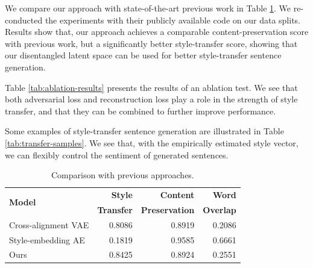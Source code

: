 We compare our approach with state-of-the-art previous work in Table \ref{tab:comparison-previous}. We re-conducted the experiments with their publicly available code on our data splits.
Results show that, our approach achieves a comparable content-preservation score with previous work, but a significantly better style-transfer score, showing that our disentangled latent space can be used for better style-transfer sentence generation.

Table \ref{tab:ablation-results} presents the results of an ablation test. We see that both adversarial loss and reconstruction loss play a role in the strength of style transfer, and that they can be combined to further improve performance.

Some examples of style-transfer sentence generation are illustrated in Table \ref{tab:transfer-samples}. We see that, with the empirically estimated style vector, we can flexibly control the sentiment of generated sentences.

\begin{table}[ht]
	\centering
	\begin{tabular}{| l | r | r | r |}
		\hline
		\multirow{2}{*}{\textbf{Model}}           & \textbf{Style}    & \textbf{Content}      & \textbf{Word}    \\
		                                          & \textbf{Transfer} & \textbf{Preservation} & \textbf{Overlap} \\
		\hline
		\hline
		Cross-alignment VAE \citep{shen2017style} & 0.8086            & 0.8919                & 0.2086           \\
		\hline
		Style-embedding AE \citep{fu2017style}    & 0.1819            & 0.9585                & 0.6661           \\
		\hline
		Ours                                      & 0.8425            & 0.8924                & 0.2551           \\
		\hline
	\end{tabular}
	\caption{Comparison with previous approaches.}
	\label{tab:comparison-previous}
\end{table}



